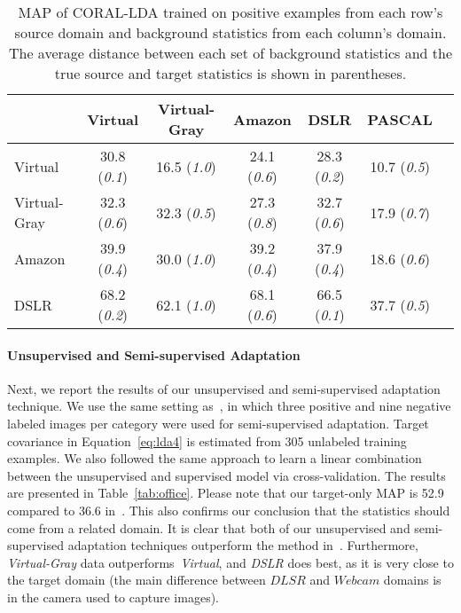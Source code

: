 \documentclass[graybox]{svmult}
\begin{document}
\begin{table}
\begin{small}
\begin{center}
\begin{tabular}{|l||c|c|c|c|c|c|}
\hline
  & Virtual & Virtual-Gray & Amazon  & DSLR & PASCAL\\ 
\hline
Virtual & 30.8 (\textit{0.1}) & 16.5 (\textit{1.0}) & 24.1 (\textit{0.6}) & 28.3 (\textit{0.2}) & 10.7 (\textit{0.5})\\ \hline
Virtual-Gray   & 32.3 (\textit{0.6}) & 32.3 (\textit{0.5}) & 27.3 (\textit{0.8}) & 32.7 (\textit{0.6}) & 17.9 (\textit{0.7})  \\ \hline
Amazon        & 39.9 (\textit{0.4}) & 30.0 (\textit{1.0}) & 39.2 (\textit{0.4}) & 37.9 (\textit{0.4}) & 18.6 (\textit{0.6})  \\ \hline
DSLR          &  68.2 (\textit{0.2}) & 62.1 (\textit{1.0}) & 68.1 (\textit{0.6}) & 66.5 (\textit{0.1}) & 37.7 (\textit{0.5})  \\ \hline
\end{tabular}
\end{center}
\caption{\small MAP of CORAL-LDA trained on positive examples from each row's source domain and background statistics from each column's domain. The average distance between each set of background statistics and the true source and target statistics is shown in parentheses. }\label{chap4_tab:performance}
\end{small}
\end{table}

\paragraph{\textbf{Unsupervised and Semi-supervised Adaptation}}
Next, we report the results of our unsupervised and semi-supervised adaptation technique. 
We use the same setting as~\cite{ICRA14}, in which three positive and nine negative labeled images per category were used for semi-supervised adaptation. 
Target covariance in Equation~\ref{eq:lda4} is estimated from 305 unlabeled training examples. We also followed the same approach to learn a linear combination between the unsupervised and supervised model via cross-validation. The results are presented in Table~\ref{tab:office}. Please note that our target-only MAP is 52.9 compared to 36.6 in~\cite{ICRA14}. This also confirms our conclusion that the statistics should come from a related domain. It is clear that both of our unsupervised and semi-supervised adaptation techniques outperform the method in~\cite{ICRA14}. Furthermore, \textit{Virtual-Gray} data outperforms~\textit{Virtual}, and \textit{DSLR} does best, as it is very close to the target domain (the main difference between $DLSR$ and $Webcam$ domains is in the camera used to capture images).
\end{document}

